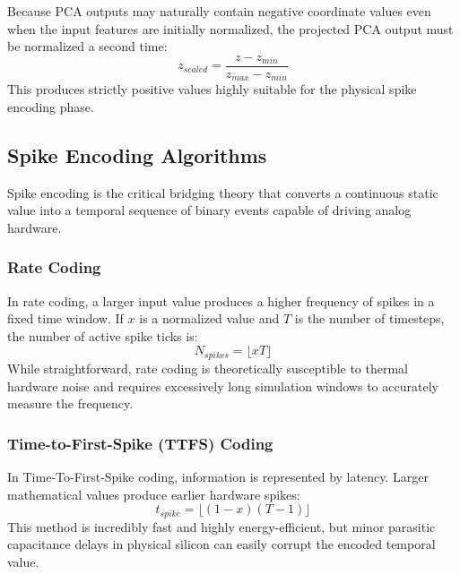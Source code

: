 \documentclass{ieeeaccess}
\begin{document}
Because PCA outputs may naturally contain negative coordinate values even when the input features are initially normalized, the projected PCA output must be normalized a second time:
\begin{equation}
z_{scaled} = \frac{z - z_{min}}{z_{max} - z_{min}}
\end{equation}
This produces strictly positive values highly suitable for the physical spike encoding phase.

\subsection{Spike Encoding Algorithms}

Spike encoding is the critical bridging theory that converts a continuous static value into a temporal sequence of binary events capable of driving analog hardware.

\subsubsection{Rate Coding}
In rate coding, a larger input value produces a higher frequency of spikes in a fixed time window. If $x$ is a normalized value and $T$ is the number of timesteps, the number of active spike ticks is:
\begin{equation}
N_{spikes} = \lfloor xT \rfloor
\end{equation}
While straightforward, rate coding is theoretically susceptible to thermal hardware noise and requires excessively long simulation windows to accurately measure the frequency.

\subsubsection{Time-to-First-Spike (TTFS) Coding}
In Time-To-First-Spike coding, information is represented by latency. Larger mathematical values produce earlier hardware spikes:
\begin{equation}
t_{spike} = \lfloor (1 - x)(T - 1) \rfloor
\end{equation}
This method is incredibly fast and highly energy-efficient, but minor parasitic capacitance delays in physical silicon can easily corrupt the encoded temporal value.
\end{document}
